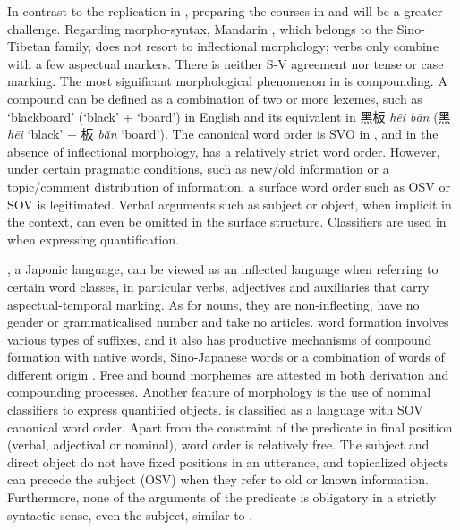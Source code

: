 \documentclass[output=paper,colorlinks,citecolor=brown,modfonts,nonflat]{../langscibook}
\begin{document}
In contrast to the replication in , preparing the courses in  and  will be a greater challenge. Regarding morpho-syntax, Mandarin , which belongs to the {Sino-Tibetan} family, does not resort to inflectional morphology; verbs only combine with a few aspectual markers. There is neither S-V agreement nor tense or case marking. The most significant morphological phenomenon in  is compounding. A compound can be defined as a combination of two or more lexemes, such as ‘blackboard’ (‘black’ + ‘board’) in English and its equivalent in  {\cjkfont 黑板} \textit{hēi bǎn} ({\cjkfont 黑} \textit{hēi} ‘black’ + {\cjkfont 板} \textit{bǎn} ‘board’). The canonical word order is SVO in , and in the absence of inflectional morphology,  has a relatively strict word order. However, under certain pragmatic conditions, such as new/old information or a topic/comment distribution of information, a surface word order such as OSV or SOV is legitimated. Verbal arguments such as subject or object, when implicit in the context, can even be omitted in the surface structure. Classifiers are used in  when expressing quantification.



, a {Japonic} language, can be viewed as an inflected language when referring to certain word classes, in particular verbs, adjectives and auxiliaries that carry aspectual-temporal marking. As for  nouns, they are non-inflecting, have no gender or grammaticalised number and take no articles.  word formation involves various types of suffixes, and it also has productive mechanisms of compound formation with native words, Sino-{Japanese} words or a combination of words of different origin \citep{Shibatani1990}. Free and bound morphemes are attested in both derivation and compounding processes. Another feature of morphology is the use of nominal classifiers to express quantified objects.  is classified as a language with SOV canonical word order. Apart from the constraint of the predicate in final position (verbal, adjectival or nominal),  word order is relatively free. The subject and direct object do not have fixed positions in an utterance, and topicalized objects can precede the subject (OSV) when they refer to old or known information. Furthermore, none of the arguments of the predicate is obligatory in a strictly syntactic sense, even the subject, similar to .
\end{document}
